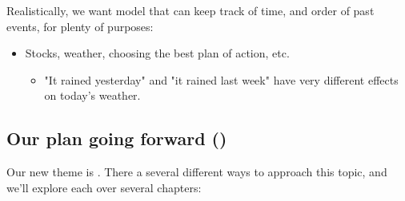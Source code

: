         Realistically, we want model that can keep track of time, and order of past events, for plenty of purposes:

        \begin{itemize}
            \item \miniex Stocks, weather, choosing the best plan of action, etc.
                \begin{itemize}
                    \item "It rained yesterday" and "it rained last week" have very different effects on today's weather.
                \end{itemize}
        \end{itemize}
        


    \phantom{}
        
    \subsection{Our plan going forward ()}
        
        Our new theme is . There a several different ways to approach this topic, and we'll explore each over several chapters:
        
